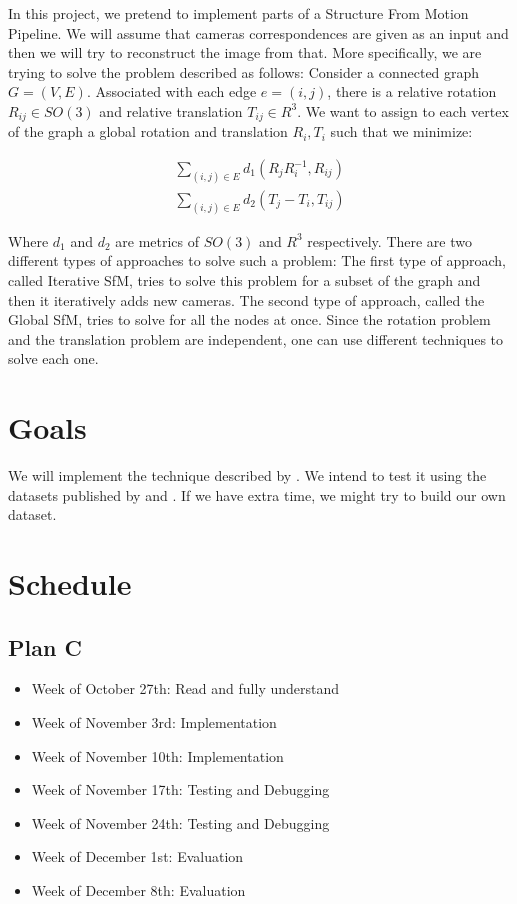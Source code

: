 \documentclass[conference, 12pt]{acmsiggraph}
\begin{document}
In this project, we pretend to implement parts of a Structure From Motion Pipeline. We will assume that cameras correspondences are given as an input and then we will try to reconstruct the image from that. More specifically, we are trying to solve the problem described as follows: Consider a connected graph $G = (V,E)$. Associated with each edge $e = (i, j)$, there is a relative rotation $R_{ij} \in SO(3)$ and relative translation $T_{ij} \in R^3$. We want to assign to each vertex of the graph a global rotation and translation $R_i, T_i$ such that we minimize:

\begin{eqnarray}
	\sum_{(i,j) \in E} d_1(R_{j}R_{i}^{-1}, R_{ij}) \\
	\sum_{(i,j) \in E} d_2(T_{j}-T_{i}, T_{ij})
\end{eqnarray}

Where $d_1$ and $d_2$ are metrics of $SO(3)$ and $R^3$ respectively. There are two different types of approaches to solve such a problem: The first type of approach, called Iterative SfM, tries to solve this problem for a subset of the graph and then it iteratively adds new cameras. The second type of approach, called the Global SfM, tries to solve for all the nodes at once. Since the rotation problem and the translation problem are independent, one can use different techniques to solve each one.

\section{Goals}

We will implement the technique described by \cite{rotation}. We intend to test it using the datasets published by \cite{rotation} and \cite{translation}. If we have extra time, we might try to build our own dataset.

\section{Schedule}

\subsection{Plan C}

\begin{itemize}
	\item {Week of October 27th}: Read and fully understand \cite{rotation}
	\item {Week of November 3rd}: Implementation
	\item {Week of November 10th}: Implementation
	\item {Week of November 17th}: Testing and Debugging
	\item {Week of November 24th}: Testing and Debugging
	\item {Week of December 1st}: Evaluation
	\item {Week of December 8th}: Evaluation
\end{itemize}




\end{document}

